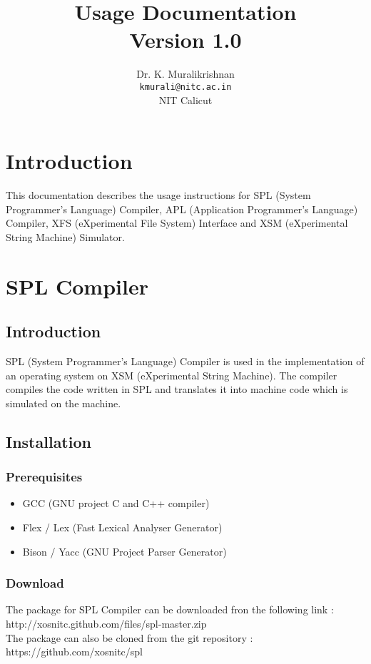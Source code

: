 \documentclass[11pt]{report}
\title{Usage Documentation \\
Version 1.0}
\author{Dr. K. Muralikrishnan  \\ \texttt{kmurali@nitc.ac.in} \\ {NIT Calicut} }
\begin{document}
\maketitle
\pagebreak

\thispagestyle{plain}

\tableofcontents
\pagebreak




\chapter{Introduction}
This documentation describes the usage instructions for SPL (System Programmer's Language) Compiler, APL (Application Programmer's Language) Compiler, XFS (eXperimental File System) Interface and XSM (eXperimental String Machine) Simulator.


\chapter{SPL Compiler}

\section{Introduction}
SPL (System Programmer's Language) Compiler is used in the implementation of an operating system on XSM (eXperimental String Machine). The compiler compiles the code written in SPL and translates it into machine code which is simulated on the machine.

\section{Installation}

\subsection{Prerequisites}
\begin{itemize}
	\item GCC  (GNU project C and C++ compiler)
	\item Flex / Lex  (Fast Lexical Analyser Generator)
	\item Bison / Yacc  (GNU Project Parser Generator)
\end{itemize} 

\subsection{Download}
The package for SPL Compiler can be downloaded fron the following link :\\
http://xosnitc.github.com/files/spl-master.zip\\
The package can also be cloned from the git repository : \\
https://github.com/xosnitc/spl
\end{document}
